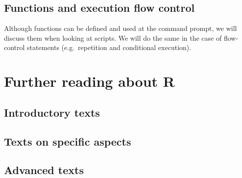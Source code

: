 \documentclass[paper=a4,10pt,div=17,headsepline,BCOR=12mm,twoside,open=right]{scrbook}\usepackage{knitr}
\begin{document}
\section{Functions and execution flow control}

Although functions can be defined and used at the command prompt, we will discuss them when looking at scripts. We will do the same in the case of flow-control statements (e.g.\ repetition and conditional execution).













\chapter{Further reading about R}\label{chap:R:readings}

\section{Introductory texts}

\nocite{Dalgaard2008,Zuur2009,Teetor2011}

\section{Texts on specific aspects}

\nocite{Chang2013,Fox2002,Fox2010,Faraway2004,Faraway2006,Everitt2011}

\section{Advanced texts}

\nocite{Xie2013,wickham2015,wickham2014advanced,Pinheiro2000,Murrell2011,Matloff2011,Ihaka1996}

\printbibliography
\end{document}
